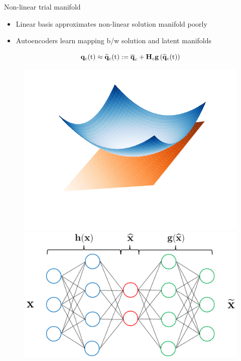\documentclass[]{beamer}
\begin{document}
\begin{frame}{Non-linear trial manifold}
	\begin{itemize}
		\item Linear basis approximates non-linear solution manifold poorly
		\item Autoencoders learn mapping b/w solution and latent manifolds\footnotemark[2]
	\end{itemize}
	\vspace{1em}
	\begin{equation*}
		\consVec(\timeVar) \approx \consVecRom(\timeVar) \defEq \consVecCent + \consScale \mathbf{g}\left(\consVecCoef(\timeVar)\right)
	\end{equation*}
	\begin{figure}
		\begin{minipage}{0.4\linewidth}
			\includegraphics[width=0.99\linewidth,trim={2em 2em 2em 2em},clip]{theory/tangentPlane.png}
		\end{minipage}
		\begin{minipage}{0.59\linewidth}
			\includegraphics[width=0.99\linewidth]{theory/CAE_dense.png}
		\end{minipage}
	\end{figure}
\end{frame}
\end{document}
